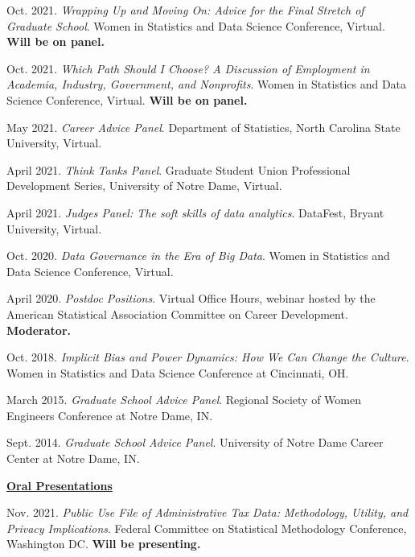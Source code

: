 \documentclass[11pt, letterpaper, roman]{moderncv} %
\begin{document}
\begin{etaremune}[topsep=0pt, itemsep=5pt, partopsep=0pt, parsep=0pt]
    \item Oct. 2021. \textit{Wrapping Up and Moving On: Advice for the Final Stretch of Graduate School}. Women in Statistics and Data Science Conference, Virtual. \textbf{Will be on panel.}
    
    \item Oct. 2021. \textit{Which Path Should I Choose? A Discussion of Employment in Academia, Industry, Government, and Nonprofits}. Women in Statistics and Data Science Conference, Virtual. \textbf{Will be on panel.}

    \item May 2021. \textit{Career Advice Panel}. Department of Statistics, North Carolina State University, Virtual.
    
    \item April 2021. \textit{Think Tanks Panel}. Graduate Student Union Professional Development Series, University of Notre Dame, Virtual.
    
    \item April 2021. \textit{Judges Panel: The soft skills of data analytics}. DataFest, Bryant University, Virtual.
    
    \item Oct. 2020. \textit{Data Governance in the Era of Big Data}. Women in Statistics and Data Science Conference, Virtual.
    
    \item April 2020. \textit{Postdoc Positions}. Virtual Office Hours, webinar hosted by the American Statistical Association Committee on Career Development. \textbf{Moderator.}
    
    \item Oct. 2018. \textit{Implicit Bias and Power Dynamics: How We Can Change the Culture}. Women in Statistics and Data Science Conference at Cincinnati, OH.
    
    \item March 2015. \textit{Graduate School Advice Panel}.  Regional Society of Women Engineers Conference at Notre Dame, IN.
    
    \item Sept. 2014. \textit{Graduate School Advice Panel}.  University of Notre Dame Career Center at Notre Dame, IN.
    
\vspace{4pt}
\hspace{-0.30in}\underline{\textbf{\large Oral Presentations}}\normalsize
    \item Nov. 2021. \textit{Public Use File of Administrative Tax Data: Methodology, Utility, and Privacy Implications}. Federal Committee on Statistical Methodology Conference, Washington DC. \textbf{Will be presenting.}
    

\end{etaremune}
\end{document}
